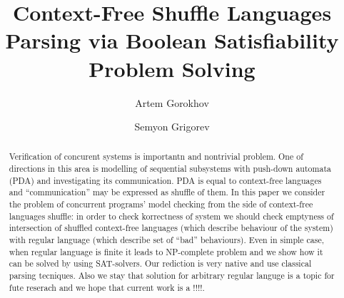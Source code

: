 \documentclass[sigconf]{acmart}
\begin{document}
\title{Context-Free Shuffle Languages Parsing via Boolean Satisfiability Problem Solving}


\author{Artem Gorokhov}

\author{Semyon Grigorev}



\begin{abstract}
    Verification of concurent systems is importantn and nontrivial problem.
    One of directions in this area is modelling of sequential subsystems with push-down automata (PDA) and investigating its communication.
    PDA is equal to context-free languages and ``communication'' may be expressed as shuffle of them.
    In this paper we consider the problem of concurrent programs' model checking from the side of context-free languages shuffle:
    in order to check korrectness of system we should check emptyness of intersection of shuffled context-free languages (which describe behaviour of the system) with regular language (which describe set of ``bad'' behaviours).
    Even in simple case, when regular language is finite it leads to NP-complete problem and we show how it can be solved by using SAT-solvers.
    Our rediction is very native and use classical parsing tecniques.
    Also we stay that solution for arbitrary regular languge is a topic for fute reserach and we hope that current work is a !!!!.
\end{abstract}

%
%



\maketitle





\end{document}
